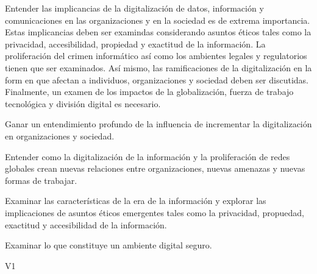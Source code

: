 \begin{syllabus}


\begin{justification}
Entender las implicancias de la digitalización de datos, información y comunicaciones en las organizaciones y en la sociedad es de extrema importancia. Estas implicancias deben ser examindas considerando asuntos éticos tales como la privacidad, accesibilidad, propiedad y exactitud de la información. La proliferación del crimen informático así como los ambientes legales y regulatorios tienen que ser examinados. Así mismo, las ramificaciones de la digitalización en la form en que afectan a individuos, organizaciones y sociedad deben ser discutidas. Finalmente, un examen de los impactos de la globalización, fuerza de trabajo tecnológica y división digital es necesario.
\end{justification}

\begin{goals}
\item Ganar un entendimiento profundo de la influencia de incrementar la digitalización en organizaciones y sociedad.
\item Entender como la digitalización de la información y la proliferación de redes globales crean nuevas relaciones entre organizaciones, nuevas amenazas y nuevas formas de trabajar.
\item Examinar las características de la era de la información y explorar las implicaciones de asuntos éticos emergentes tales como la privacidad, propuedad, exactitud y accesibilidad de la información.
\item Examinar lo que constituye un ambiente digital seguro.
\end{goals}

\begin{outcomes}{V1}
\end{outcomes}


\end{syllabus}
